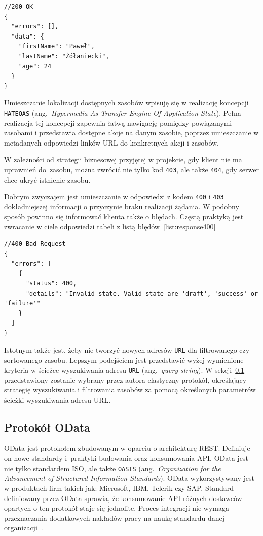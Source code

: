 {\belowcaptionskip=-10pt
\begin{lstlisting}[label=list:response200,
    caption=Przykład pomyślnej odpowiedzi serwera]
//200 OK
{
  "errors": [],
  "data": {
    "firstName": "Paweł",
    "lastName": "Żółaniecki",
    "age": 24
  }
}
\end{lstlisting}
}

Umieszczanie lokalizacji dostępnych zasobów wpisuję się w realizację koncepcji \texttt{HATEOAS} (ang.~\emph{Hypermedia As Transfer Engine Of Application State}). Pełna realizacja tej koncepcji zapewnia łatwą nawigację pomiędzy powiązanymi zasobami i przedstawia dostępne akcje na danym zasobie, poprzez umieszczanie w metadanych odpowiedzi linków URL do konkretnych akcji i zasobów.

W zależności od strategii biznesowej przyjętej w projekcie, gdy klient nie ma uprawnień do~zasobu, można zwrócić nie tylko kod \texttt{403}, ale także \texttt{404}, gdy serwer chce ukryć istnienie zasobu.

Dobrym zwyczajem jest umieszczanie w odpowiedzi z kodem \texttt{400} i \texttt{403} dokładniejszej informacji o przyczynie braku realizacji żądania. W podobny sposób powinno się informować klienta także o błędach. Częstą praktyką jest zwracanie w ciele odpowiedzi tabeli z listą błędów~\ref{list:response400}

{\belowcaptionskip=-10pt
\begin{lstlisting}[label=list:response400,
    caption=Odpowiedź serwera zawierająca opis błędu]
//400 Bad Request
{
  "errors": [
    {
      "status": 400,
      "details": "Invalid state. Valid state are 'draft', 'success' or 'failure'"
    }
  ]
}
\end{lstlisting}
}

Istotnym także jest, żeby nie tworzyć nowych adresów \texttt{URL} dla filtrowanego czy sortowanego zasobu. Lepszym podejściem jest przedstawić wyżej wymienione kryteria w ścieżce wyszukiwania adresu \texttt{URL} (ang.~\emph{query string}). W sekcji~\ref{subsec:odata} przedstawiony zostanie wybrany przez autora elastyczny protokół, określający strategię wyszukiwania i filtrowania zasobów za pomocą określonych parametrów ścieżki wyszukiwania adresu URL.

\subsection{Protokół OData}
\label{subsec:odata}

OData jest protokołem zbudowanym w oparciu o architekturę REST. Definiuje on nowe standardy i~praktyki budowania oraz konsumowania API. OData jest nie tylko standardem ISO, ale także \texttt{OASIS} (ang.~\emph{Organization for the Advancement of Structured Information Standards}). OData wykorzystywany jest w produktach firm takich jak: Microsoft, IBM, Telerik czy SAP. Standard definiowany przez OData sprawia, że konsumowanie API różnych dostawców opartych o ten protokół staje się jednolite. Proces integracji nie wymaga przeznaczania dodatkowych nakładów pracy na naukę standardu danej organizacji~\cite{odata-why-use}.

